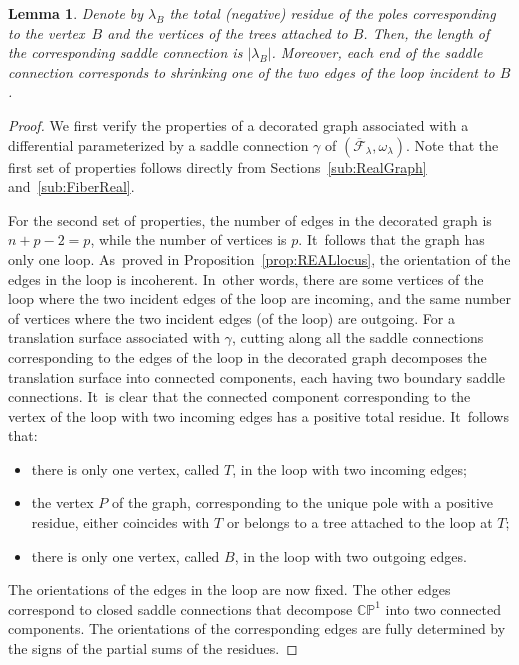 \documentclass[11pt]{article}
\newtheorem{lem}[thm]{Lemma}
\theoremstyle{definition}
\begin{document}
\begin{lem}
Denote by $\lambda_{B}$ the total (negative) residue of the poles corresponding to the vertex~$B$ and the vertices of the trees attached to $B$. Then, the length of the corresponding saddle connection is $|\lambda_{B}|$. Moreover, each end of the saddle connection corresponds to shrinking one of the two edges of the loop incident to $B$.
\end{lem}

\begin{proof}
We first verify the properties of a decorated graph associated with a differential parameterized by a saddle connection $\gamma$ of $(\overline{\mathcal{F}}_{\lambda}, \omega_\lambda)$. Note that the first set of properties follows directly from Sections~\ref{sub:RealGraph} and~\ref{sub:FiberReal}.

For the second set of properties, the number of edges in the decorated graph is $n+p-2=p$, while the number of vertices is $p$. It~follows that the graph has only one loop. As~proved in Proposition~\ref{prop:REALlocus}, the orientation of the edges in the loop is incoherent. In~other words, there are some vertices of the loop where the two incident edges of the loop are incoming, and the same number of vertices where the two incident edges (of the loop) are outgoing. For a translation surface associated with $\gamma$, cutting along all the saddle connections corresponding to the edges of the loop in the decorated graph decomposes the translation surface into connected components, each having two boundary saddle connections. It~is clear that the connected component corresponding to the vertex of the loop with two incoming edges has a positive total residue. It~follows that:
\begin{itemize}
\item there is only one vertex, called $T$, in the loop with two incoming edges;
\item the vertex $P$ of the graph, corresponding to the unique pole with a positive residue, either coincides with $T$ or belongs to a tree attached to the loop at $T$;
\item there is only one vertex, called $B$, in the loop with two outgoing edges.
\end{itemize}
The orientations of the edges in the loop are now fixed. The other edges correspond to closed saddle connections that decompose $\mathbb{CP}^{1}$ into two connected components. The orientations of the corresponding edges are fully determined by the signs of the partial sums of the residues.


\end{proof}
\end{document}
